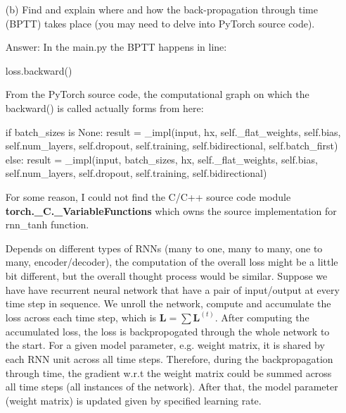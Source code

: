 \documentclass[12pt,letterpaper]{article}
\begin{document}
\begin{itemize}
    
    \item[(b)]Find and explain where and how the back-propagation through time (BPTT) takes place (you may need to delve into PyTorch source code).
    
    Answer: In the main.py the BPTT happens in line:
    \begin{python}
        loss.backward()
    \end{python}
    
    From the PyTorch source code, the computational graph on which the backward() is called actually forms from here:
    \begin{python}
    if batch_sizes is None:
        result = _impl(input, hx, self._flat_weights, self.bias, self.num_layers,
         self.dropout, self.training, self.bidirectional, self.batch_first)
    else:
        result = _impl(input, batch_sizes, hx, self._flat_weights, self.bias,
         self.num_layers, self.dropout, self.training, self.bidirectional)
    \end{python}
    For some reason, I could not find the C/C++ source code module\\ \textbf{torch.\_C.\_VariableFunctions} which owns the source implementation for rnn\_tanh function.
    
    Depends on different types of RNNs (many to one, many to many, one to many, encoder/decoder), the computation of the overall loss might be a little bit different, but the overall thought process would be similar. Suppose we have have recurrent neural network that have a pair of input/output at every time step in sequence. We unroll the network, compute and accumulate the loss across each time step, which is $\textbf{L} = \sum \textbf{L}^{(t)}$. After computing the accumulated loss, the loss is backpropogated through the whole network to the start. For a given model parameter, e.g. weight matrix, it is shared by each RNN unit across all time steps. Therefore, during the backpropagation through time, the gradient w.r.t the weight matrix could be summed across all time steps (all instances of the network). After that, the model parameter (weight matrix) is updated given by specified learning rate.
    

\end{itemize}
\end{document}

